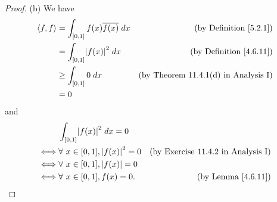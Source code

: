 \begin{proof}{(b)}
    We have
    \begin{align*}
        \inner*{f, f} & = \int_{[0, 1]} f(x) \overline{f(x)} \; dx & \text{(by Definition \ref{5.2.1})}          \\
                      & = \int_{[0, 1]} \abs*{f(x)}^2 \; dx        & \text{(by Definition \ref{4.6.11})}         \\
                      & \geq \int_{[0, 1]} 0 \; dx                 & \text{(by Theorem 11.4.1(d) in Analysis I)} \\
                      & = 0
    \end{align*}
    and
    \begin{align*}
             & \int_{[0, 1]} \abs*{f(x)}^2 \; dx = 0                                                \\
        \iff & \forall\ x \in [0, 1], \abs*{f(x)}^2 = 0 & \text{(by Exercise 11.4.2 in Analysis I)} \\
        \iff & \forall\ x \in [0, 1], \abs*{f(x)} = 0                                               \\
        \iff & \forall\ x \in [0, 1], f(x) = 0.         & \text{(by Lemma \ref{4.6.11})}
    \end{align*}
\end{proof}

